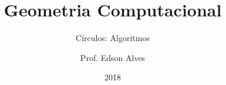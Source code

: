 \title{Geometria Computacional}
\subtitle{Círculos: Algoritmos}
\date{2018}
\author{Prof. Edson Alves}
